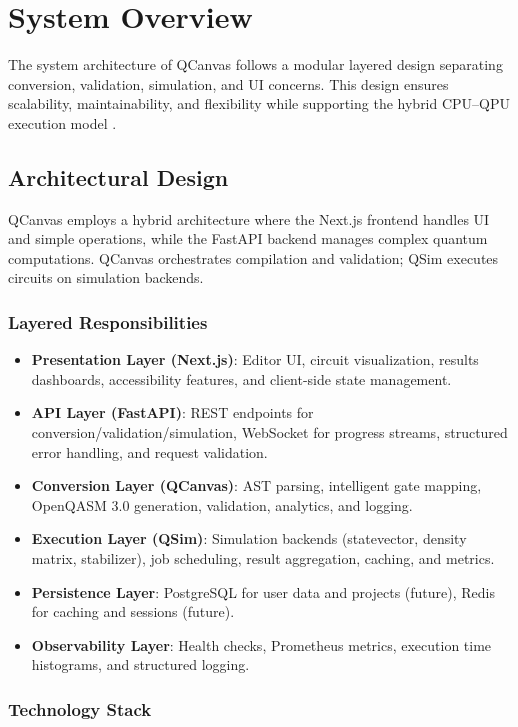 \chapter{System Overview}

The system architecture of QCanvas follows a modular layered design separating conversion, validation, simulation, and UI concerns. This design ensures scalability, maintainability, and flexibility while supporting the hybrid CPU–QPU execution model \cite{peruzzo2014variational}.

\section{Architectural Design}

QCanvas employs a hybrid architecture where the Next.js frontend handles UI and simple operations, while the FastAPI backend manages complex quantum computations. QCanvas orchestrates compilation and validation; QSim executes circuits on simulation backends.

\subsection{Layered Responsibilities}
\begin{itemize}
    \item \textbf{Presentation Layer (Next.js)}: Editor UI, circuit visualization, results dashboards, accessibility features, and client-side state management.
    \item \textbf{API Layer (FastAPI)}: REST endpoints for conversion/validation/simulation, WebSocket for progress streams, structured error handling, and request validation.
    \item \textbf{Conversion Layer (QCanvas)}: AST parsing, intelligent gate mapping, OpenQASM 3.0 generation, validation, analytics, and logging.
    \item \textbf{Execution Layer (QSim)}: Simulation backends (statevector, density matrix, stabilizer), job scheduling, result aggregation, caching, and metrics.
    \item \textbf{Persistence Layer}: PostgreSQL for user data and projects (future), Redis for caching and sessions (future).
    \item \textbf{Observability Layer}: Health checks, Prometheus metrics, execution time histograms, and structured logging.
\end{itemize}

\subsection{Technology Stack}

